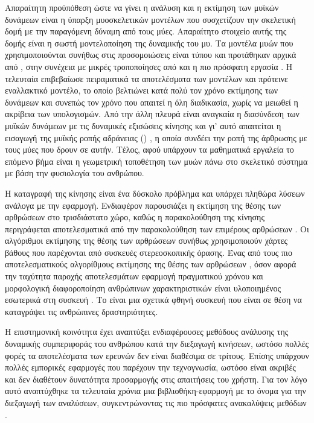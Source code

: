 Απαραίτητη προϋπόθεση ώστε να γίνει η ανάλυση και η εκτίμηση των μυϊκών δυνάμεων είναι η ύπαρξη μυοσκελετικών μοντέλων που συσχετίζουν την σκελετική δομή με την παραγόμενη δύναμη από τους μύες. Απαραίτητο στοιχείο αυτής της δομής είναι η σωστή μοντελοποίηση της δυναμικής του μυ. Τα μοντέλα μυών που χρησιμοποιούνται συνήθως στις προσομοιώσεις είναι τύπου  και προτάθηκαν αρχικά από \cite{zajac89}, στην συνέχεια με μικρές τροποποίησες από \cite{thelen03} και η πιο πρόσφατη εργασία \cite{millard13}. Η τελευταία επιβεβαίωσε πειραματικά τα αποτελέσματα των μοντέλων και πρότεινε εναλλακτικό μοντέλο, το οποίο βελτιώνει κατά πολύ τον χρόνο εκτίμησης των δυνάμεων και συνεπώς τον χρόνο που απαιτεί η όλη διαδικασία, χωρίς να μειωθεί η ακρίβεια των υπολογισμών. Από την άλλη πλευρά είναι αναγκαία η διασύνδεση των μυϊκών δυνάμεων με τις δυναμικές εξισώσεις κίνησης και γι' αυτό απαιτείται η εισαγωγή της μυϊκής ροπής αδράνειας () \cite{delp95}, η οποία συνδέει την ροπή της άρθρωσης με τους μύες που δρουν σε αυτήν. Τέλος, αφού υπάρχουν τα μαθηματικά εργαλεία το επόμενο βήμα είναι η γεωμετρική τοποθέτηση των μυών πάνω στο σκελετικό σύστημα με βάση την φυσιολογία του ανθρώπου.

Η καταγραφή της κίνησης είναι ένα δύσκολο πρόβλημα και υπάρχει πληθώρα λύσεων ανάλογα με την εφαρμογή. Ενδιαφέρον παρουσιάζει η εκτίμηση της θέσης των αρθρώσεων στο τρισδιάστατο χώρο, καθώς η παρακολούθηση της κίνησης περιγράφεται αποτελεσματικά από την παρακολούθηση των επιμέρους αρθρώσεων \cite{poppe07}. Οι αλγόριθμοι εκτίμησης της θέσης των αρθρώσεων συνήθως χρησιμοποιούν χάρτες βάθους που παρέχονται από συσκευές στερεοσκοπικής όρασης. Ένας από τους πιο αποτελεσματικούς αλγορίθμους εκτίμησης της θέσης των αρθρώσεων \cite{shotton11}, όσον αφορά την ταχύτητα παροχής αποτελεσμάτων εφαρμογή πραγματικού χρόνου και μορφολογική διαφοροποίηση ανθρώπινων χαρακτηριστικών είναι υλοποιημένος εσωτερικά στη συσκευή . Το  είναι μια σχετικά φθηνή συσκευή που είναι σε θέση να καταγράψει τις ανθρώπινες δραστηριότητες.

Η επιστημονική κοινότητα έχει αναπτύξει ενδιαφέρουσες μεθόδους ανάλυσης της δυναμικής συμπεριφοράς του ανθρώπου κατά την διεξαγωγή κινήσεων, ωστόσο πολλές φορές τα αποτελέσματα των ερευνών δεν είναι διαθέσιμα σε τρίτους. Επίσης υπάρχουν πολλές εμπορικές εφαρμογές που παρέχουν την τεχνογνωσία, ωστόσο είναι ακριβές και δεν διαθέτουν δυνατότητα προσαρμογής στις απαιτήσεις του χρήστη. Για τον λόγο αυτό αναπτύχθηκε τα τελευταία χρόνια μια βιβλιοθήκη-εφαρμογή με το όνομα  για την διεξαγωγή των αναλύσεων, συγκεντρώνοντας τις πιο πρόσφατες ανακαλύψεις μεθόδων \cite{delp07}.

